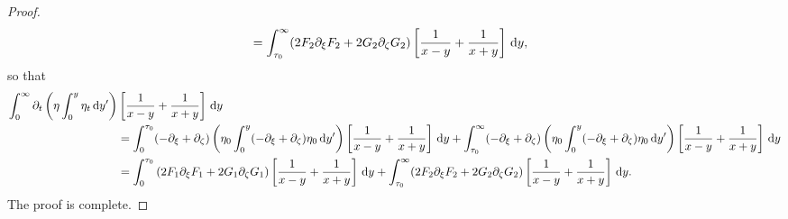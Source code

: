 \documentclass[10pt,reqno,oneside,a4paper, landscape]{article}
\begin{document}
\begin{proof}
\begin{align*}
&= \int_{\tau_0}^\infty (2 F_2 \partial_\xi F_2 + 2 G_2 \partial_\zeta G_2 )\left[ \frac{1}{x-y} + \frac{1}{x+y} \right] \,\mathrm{d} y,
\end{align*}
so that 
\begin{align*}
\int_0^\infty \partial_t \left( \eta \int^{y}_0\eta_{t} \,\mathrm{d} y' \right) &\left[ \frac{1}{x-y} + \frac{1}{x+y} \right] \,\mathrm{d} y \\
&= \int_0^{\tau_0} (- \partial_\xi + \partial_\zeta)\left( \eta_0 \int^{y}_0 (- \partial_\xi + \partial_\zeta)\eta_0 \,\mathrm{d} y' \right) \left[ \frac{1}{x-y} + \frac{1}{x+y} \right] \,\mathrm{d} y + \int_{\tau_0}^\infty (- \partial_\xi + \partial_\zeta)\left( \eta_0 \int^{y}_0 (- \partial_\xi + \partial_\zeta)\eta_0 \,\mathrm{d} y' \right) \left[ \frac{1}{x-y} + \frac{1}{x+y} \right] \,\mathrm{d} y\\
&= \int_0^{\tau_0} \left( 2 F_1  \partial_\xi F_1 + 2 G_1 \partial_\zeta G_1 \right) \left[ \frac{1}{x-y} + \frac{1}{x+y} \right] \,\mathrm{d} y +\int_{\tau_0}^\infty (2 F_2 \partial_\xi F_2 + 2 G_2 \partial_\zeta G_2 )\left[ \frac{1}{x-y} + \frac{1}{x+y} \right] \,\mathrm{d} y.
\end{align*}
The proof is complete. 
\end{proof}

{\small}
\end{document}
